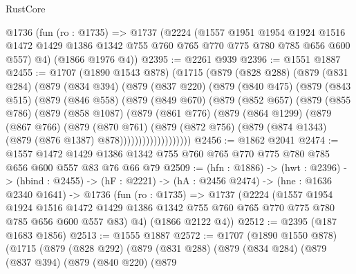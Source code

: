 \begin{lexlean}{RustCore}
\begin{coremodule}
  @1736
    (fun (ro : @1735) =>
    @1737
      (@2224
        (@1557
          @1951
          @1954
          @1924
          @1516
          @1472
          @1429
          @1386
          @1342
          @755
          @760
          @765
          @770
          @775
          @780
          @785
          @656
          @600
          @557)
        @4)
      (@1866 @1976 @4))
@2395 := @2261 @939
@2396 := @1551 @1887
@2455 := @1707
    (@1890 @1543 @878)
    (@1715
      (@879
        (@828 @288)
        (@879
          (@831 @284)
          (@879
            (@834 @394)
            (@879
              (@837 @220)
              (@879
                (@840 @475)
                (@879
                  (@843 @515)
                  (@879
                    (@846 @558)
                    (@879
                      (@849 @670)
                      (@879
                        (@852 @657)
                        (@879
                          (@855 @786)
                          (@879
                            (@858 @1087)
                            (@879
                              (@861 @776)
                              (@879
                                (@864 @1299)
                                (@879
                                  (@867 @766)
                                  (@879
                                    (@870 @761)
                                    (@879
                                      (@872 @756)
                                      (@879 (@874 @1343) (@879 (@876 @1387) @878)))))))))))))))))))
@2456 := @1862 @2041
@2474 := @1557
    @1472
    @1429
    @1386
    @1342
    @755
    @760
    @765
    @770
    @775
    @780
    @785
    @656
    @600
    @557
    @83
    @76
    @66
    @79
@2509 := (hfn : @1886) ->
  (hwt : @2396) ->
  (hbind : @2455) ->
  (hF : @2221) ->
  (hA : @2456 @2474) ->
  (hne : @1636 @2340 @1641) ->
  @1736
    (fun (ro : @1735) =>
    @1737
      (@2224
        (@1557
          @1954
          @1924
          @1516
          @1472
          @1429
          @1386
          @1342
          @755
          @760
          @765
          @770
          @775
          @780
          @785
          @656
          @600
          @557
          @83)
        @4)
      (@1866 @2122 @4))
@2512 := @2395 (@187 @1683 @1856)
@2513 := @1555 @1887
@2572 := @1707
    (@1890 @1550 @878)
    (@1715
      (@879
        (@828 @292)
        (@879
          (@831 @288)
          (@879
            (@834 @284)
            (@879
              (@837 @394)
              (@879
                (@840 @220)
                (@879

\end{coremodule}
\end{lexlean}
